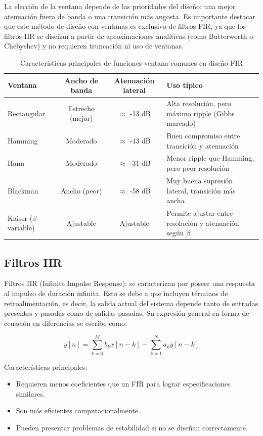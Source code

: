 \documentclass[12pt]{article}
\begin{document}
	La elección de la ventana depende de las prioridades del diseño: una mejor atenuación fuera de banda o una transición más angosta. Es importante destacar que este método de diseño con ventanas es exclusivo de filtros FIR, ya que los filtros IIR se diseñan a partir de aproximaciones analíticas (como Butterworth o Chebyshev) y no requieren truncación ni uso de ventanas.
	
	\begin{table}[H]
		\centering
		\begin{tabularx}{\textwidth}{|l|c|c|X|}
			\hline
			\textbf{Ventana} & \textbf{Ancho de banda} & \textbf{Atenuación lateral} & \textbf{Uso típico} \\
			\hline
			Rectangular & Estrecho (mejor) & $\approx$ -13 dB & Alta resolución, pero máximo ripple (Gibbs marcado) \\
			\hline
			Hamming     & Moderado          & $\approx$ -43 dB & Buen compromiso entre transición y atenuación \\
			\hline
			Hann        & Moderado          & $\approx$ -31 dB & Menor ripple que Hamming, pero peor resolución \\
			\hline
			Blackman    & Ancho (peor)      & $\approx$ -58 dB & Muy buena supresión lateral, transición más ancha \\
			\hline
			Kaiser ($\beta$ variable) & Ajustable & Ajustable & Permite ajustar entre resolución y atenuación según $\beta$ \\
			\hline
		\end{tabularx}
		\caption{Características principales de funciones ventana comunes en diseño FIR}
		\label{tabla:ventanas}
	\end{table}
	
	
	\subsection{Filtros IIR}
	Filtros IIR (Infinite Impulse Response): se caracterizan por poseer una respuesta al impulso de duración infinita. Esto se debe a que incluyen términos de retroalimentación, es decir, la salida actual del sistema depende tanto de entradas presentes y pasadas como de salidas pasadas. Su expresión general en forma de ecuación en diferencias se escribe como:
	
	\begin{equation}
		y[n] = \sum_{k=0}^{M} b_k x[n-k] - \sum_{k=1}^{N} a_k y[n-k]
	\end{equation}
	
	Características principales:
	\begin{itemize}
		\item Requieren menos coeficientes que un FIR para lograr especificaciones similares.
		\item Son más eficientes computacionalmente.
		\item Pueden presentar problemas de estabilidad si no se diseñan correctamente.
	\end{itemize}
	
\end{document}
